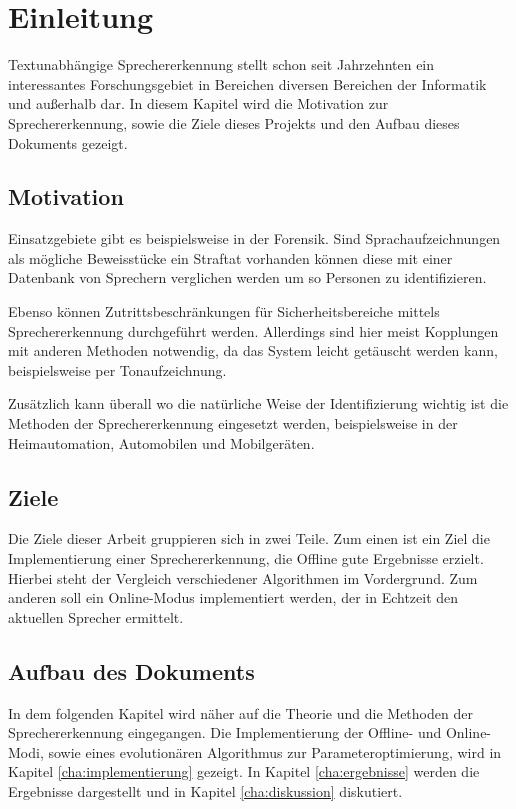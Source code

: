 \chapter{Einleitung}
Textunabhängige Sprechererkennung stellt schon seit Jahrzehnten ein interessantes Forschungsgebiet in Bereichen diversen Bereichen der Informatik und außerhalb dar. \cite{bib:speakerRecognition} In diesem Kapitel wird die Motivation zur Sprechererkennung, sowie die Ziele dieses Projekts und den Aufbau dieses Dokuments gezeigt.

\section{Motivation}
Einsatzgebiete gibt es beispielsweise in der Forensik. Sind Sprachaufzeichnungen als mögliche Beweisstücke ein Straftat vorhanden können diese mit einer Datenbank von Sprechern verglichen werden um so Personen zu identifizieren.

Ebenso können Zutrittsbeschränkungen für Sicherheitsbereiche mittels Sprechererkennung durchgeführt werden. Allerdings sind hier meist Kopplungen mit anderen Methoden notwendig, da das System leicht getäuscht werden kann, beispielsweise per Tonaufzeichnung.

Zusätzlich kann überall wo die natürliche Weise der Identifizierung wichtig ist die Methoden der Sprechererkennung eingesetzt werden, beispielsweise in der Heimautomation, Automobilen und Mobilgeräten.

\section{Ziele}
Die Ziele dieser Arbeit gruppieren sich in zwei Teile. Zum einen ist ein Ziel die Implementierung einer Sprechererkennung, die Offline gute Ergebnisse erzielt. Hierbei steht der Vergleich verschiedener Algorithmen im Vordergrund. Zum anderen soll ein Online-Modus implementiert werden, der in Echtzeit den aktuellen Sprecher ermittelt.

\section{Aufbau des Dokuments}
In dem folgenden Kapitel wird näher auf die Theorie und die Methoden der Sprechererkennung eingegangen. Die Implementierung der Offline- und Online-Modi, sowie eines evolutionären Algorithmus zur Parameteroptimierung, wird in Kapitel \ref{cha:implementierung} gezeigt. In Kapitel \ref{cha:ergebnisse} werden die Ergebnisse dargestellt und in Kapitel \ref{cha:diskussion} diskutiert.

